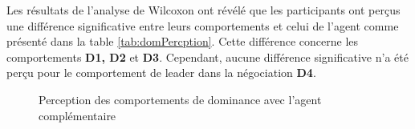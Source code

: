 	Les résultats de l'analyse de Wilcoxon ont révélé que les participants ont perçus une différence significative entre leurs comportements et celui de l'agent comme présenté dans la table \ref{tab:domPercption}. Cette différence concerne les comportements \textbf{D1, D2} et \textbf{D3}. Cependant, aucune différence significative n'a été perçu pour le comportement de leader dans la négociation \textbf{D4}. 
	\begin{figure}[h]
		\centering
		
		\caption{Perception des comportements de dominance avec l'agent complémentaire}
		\label{fig:comp}
	\end{figure}	
	
